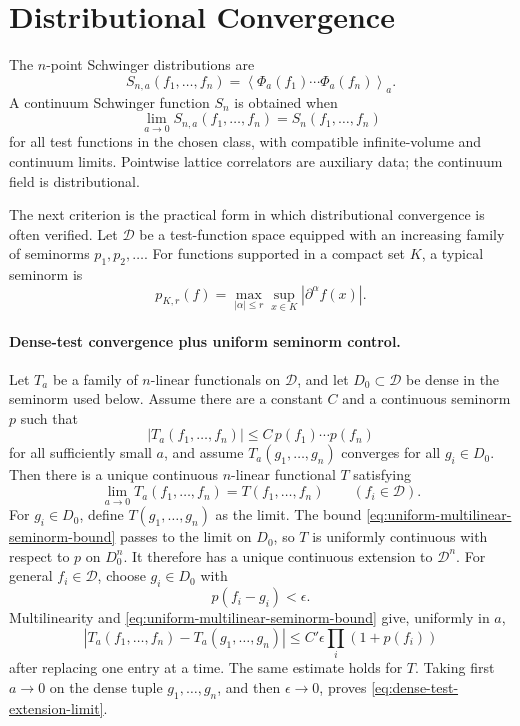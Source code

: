 \section{Distributional Convergence}

The \(n\)-point Schwinger distributions are
\[
  S_{n,a}(f_1,\ldots,f_n)
  =
  \left\langle
  \Phi_a(f_1)\cdots \Phi_a(f_n)
  \right\rangle_a .
\]
A continuum Schwinger function \(S_n\) is obtained when
\[
  \lim_{a\to0}S_{n,a}(f_1,\ldots,f_n)
  =
  S_n(f_1,\ldots,f_n)
\]
for all test functions in the chosen class, with compatible infinite-volume
and continuum limits.  Pointwise lattice correlators are auxiliary data; the
continuum field is distributional.

The next criterion is the practical form in which distributional convergence
is often verified.  Let \(\mathcal D\) be a test-function space equipped with
an increasing family of seminorms \(p_1,p_2,\ldots\).  For functions
supported in a compact set \(K\), a typical seminorm is
\[
  p_{K,r}(f)=\max_{|\alpha|\leq r}\sup_{x\in K}|\partial^\alpha f(x)|.
\]

\paragraph{Dense-test convergence plus uniform seminorm control.}
Let \(T_a\) be a family of \(n\)-linear functionals on \(\mathcal D\), and
let \(D_0\subset\mathcal D\) be dense in the seminorm used below.  Assume
there are a constant \(C\) and a continuous seminorm \(p\) such that
\begin{equation}
  |T_a(f_1,\ldots,f_n)|
  \leq
  C\,p(f_1)\cdots p(f_n)
  \label{eq:uniform-multilinear-seminorm-bound}
\end{equation}
for all sufficiently small \(a\), and assume \(T_a(g_1,\ldots,g_n)\)
converges for all \(g_i\in D_0\).  Then there is a unique continuous
\(n\)-linear functional \(T\) satisfying
\begin{equation}
  \lim_{a\to0}T_a(f_1,\ldots,f_n)=T(f_1,\ldots,f_n)
  \qquad(f_i\in\mathcal D).
  \label{eq:dense-test-extension-limit}
\end{equation}
For \(g_i\in D_0\), define \(T(g_1,\ldots,g_n)\) as the limit.  The bound
\eqref{eq:uniform-multilinear-seminorm-bound} passes to the limit on \(D_0\),
so \(T\) is uniformly continuous with respect to \(p\) on \(D_0^n\).  It
therefore has a unique continuous extension to \(\mathcal D^n\).  For
general \(f_i\in\mathcal D\), choose \(g_i\in D_0\) with
\[
  p(f_i-g_i)<\epsilon .
\]
Multilinearity and \eqref{eq:uniform-multilinear-seminorm-bound} give,
uniformly in \(a\),
\[
  |T_a(f_1,\ldots,f_n)-T_a(g_1,\ldots,g_n)|
  \leq
  C'\epsilon
  \prod_i(1+p(f_i))
  \]
after replacing one entry at a time.  The same estimate holds for \(T\).
Taking first \(a\to0\) on the dense tuple \(g_1,\ldots,g_n\), and then
\(\epsilon\to0\), proves \eqref{eq:dense-test-extension-limit}.

